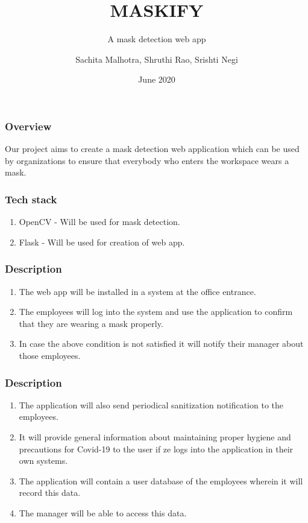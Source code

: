 \documentclass[14pt]{beamer}
\title{MASKIFY}
\subtitle{A mask detection web app}
\author[TEAM 6]{Sachita Malhotra, Shruthi Rao, Srishti Negi}
\date{June 2020}
\newcounter{saveenumerate}
\newcommand{\saveenumerate}{\setcounter{saveenumerate}{\value{enumi}}}
\newcommand{\restartenumerate}{\setcounter{enumi}{\value{saveenumerate}}}
\begin{document}
\begin{frame}
    \titlepage
\end{frame}

\begin{frame}
    \frametitle{Overview}
    Our project aims to create a mask detection web application which can be used by organizations to ensure that everybody who enters the workspace wears a mask.
\end{frame}

\begin{frame}
    \frametitle{Tech stack}
    \begin{enumerate}
        \item OpenCV - Will be used for mask detection.
        \item Flask - Will be used for creation of web app.
    \end{enumerate}
\end{frame} 

\begin{frame}
    \frametitle{Description}
    \begin{enumerate}
        \item The web app will be installed in a system at the office entrance.

        \item The employees will log into the system and use the application to confirm that they are wearing a mask properly.

        \item In case the above condition is not satisfied it will notify their manager about those employees.
        \saveenumerate
    \end{enumerate}
\end{frame}

\begin{frame}
    \frametitle{Description}
    \begin{enumerate}
        \restartenumerate
        \item The application will also send periodical sanitization notification to the employees.
            
        \item It will provide general information about maintaining proper hygiene and precautions for Covid-19 to the user if ze logs into the application in their own systems.
        
        \item The application will contain a user database of the employees wherein it will record this data.
        
        \item The manager will be able to access this data.
    \end{enumerate}
\end{frame}
\end{document}
